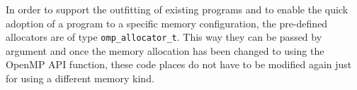 
In order to support the outfitting of existing programs and to enable the quick
adoption of a program to a specific memory configuration, the pre-defined
allocators are of type \texttt{omp\_allocator\_t}.
This way they can be passed by argument and once the memory allocation has
been changed to using the OpenMP API function, these code places do not have to
be modified again just for using a different memory kind.
